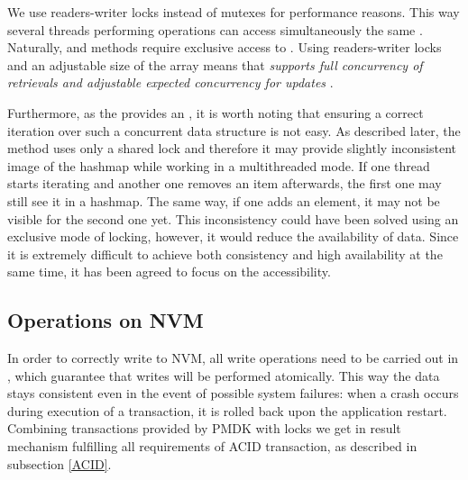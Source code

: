     We use readers-writer locks instead of mutexes for performance reasons. 
    This way several threads performing \getMethod operations can access simultaneously the same \internalHashMap. 
    Naturally, \insertMethod and \removeMethod methods require exclusive access to \internalHashMap.
    Using readers-writer locks and an adjustable size of the \internalHashMap array means that \PHT \emph{supports full concurrency of retrievals and adjustable expected concurrency for updates} \cite{ConcurrentHashMapJava}. 
    
    Furthermore, as the \NvmHashMap provides an \Iterator, it is worth noting that ensuring a correct iteration over such a concurrent data structure is not easy. 
    As described later, the \iterateMethod method uses only a shared lock and therefore it may provide slightly inconsistent image of the hashmap while working in a multithreaded mode.
    If one thread starts iterating and another one removes an item afterwards, the first one may still see it in a hashmap. 
    The same way, if one adds an element, it may not be visible for the second one yet. 
    This inconsistency could have been solved using an exclusive mode of locking, however, it would reduce the availability of data. 
    Since it is extremely difficult to achieve both consistency and high availability at the same time, it has been agreed to focus on the accessibility.

\subsection{Operations on NVM}

    In order to correctly write to NVM, all write operations need to be carried out in \pmdktransactions, which guarantee that writes will be performed atomically. 
    This way the data stays consistent even in the event of possible system failures: when a crash occurs during execution of a transaction, it is rolled back upon the application restart.
    Combining transactions provided by PMDK with locks we get in result mechanism fulfilling all requirements of ACID transaction, as described in subsection \ref{ACID}.
    

